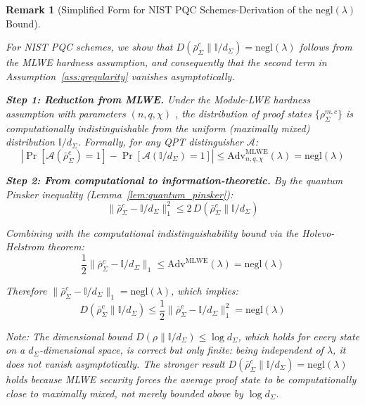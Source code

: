 \documentclass{ieeeaccess}
\newtheorem{remark}{Remark}[section]
\begin{document}
\begin{remark}[Simplified Form for NIST PQC Schemes-Derivation of 
the $\mathrm{negl}(\lambda)$ Bound]
\label{rem:nist_simplified}

For NIST PQC schemes, we show that $D(\bar{\rho}_\Sigma^c \| 
\mathbb{I}/d_\Sigma) = \mathrm{negl}(\lambda)$ follows from the 
MLWE hardness assumption, and consequently that the second term in 
Assumption~\ref{ass:qregularity} vanishes asymptotically.

\textbf{Step 1: Reduction from MLWE.}
Under the Module-LWE hardness assumption with parameters 
$(n, q, \chi)$ \cite{Langlois2015}, the distribution of 
proof states $\{\rho_\Sigma^{m,c}\}$ is computationally 
indistinguishable from the uniform (maximally mixed) 
distribution $\mathbb{I}/d_\Sigma$. Formally, for any 
QPT distinguisher $\mathcal{A}$:
\begin{equation}
    \left|\Pr[\mathcal{A}(\bar{\rho}_\Sigma^c) = 1] 
    - \Pr[\mathcal{A}(\mathbb{I}/d_\Sigma) = 1]\right|
    \leq \mathrm{Adv}^{\mathrm{MLWE}}_{n,q,\chi}(\lambda)
    = \mathrm{negl}(\lambda)
\end{equation}

\textbf{Step 2: From computational to information-theoretic.}
By the quantum Pinsker inequality (Lemma~\ref{lem:quantum_pinsker}):
\begin{equation}
    \|\bar{\rho}_\Sigma^c - \mathbb{I}/d_\Sigma\|_1^2 
    \leq 2\, D(\bar{\rho}_\Sigma^c \| \mathbb{I}/d_\Sigma)
\end{equation}

Combining with the computational indistinguishability bound via 
the Holevo-Helstrom theorem:
\begin{equation}
    \frac{1}{2}\|\bar{\rho}_\Sigma^c - \mathbb{I}/d_\Sigma\|_1
    \leq \mathrm{Adv}^{\mathrm{MLWE}}(\lambda) = \mathrm{negl}(\lambda)
\end{equation}

Therefore $\|\bar{\rho}_\Sigma^c - \mathbb{I}/d_\Sigma\|_1 
= \mathrm{negl}(\lambda)$, which implies:
\begin{equation}
    D(\bar{\rho}_\Sigma^c \| \mathbb{I}/d_\Sigma) 
    \leq \frac{1}{2}\|\bar{\rho}_\Sigma^c 
    - \mathbb{I}/d_\Sigma\|_1^2 = \mathrm{negl}(\lambda)
\end{equation}

Note: The dimensional bound $D(\rho \| \mathbb{I}/d_\Sigma) \leq \log d_\Sigma$, which holds for every state on a $d_\Sigma$-dimensional space, is correct but only finite: being independent of $\lambda$, it does not vanish asymptotically. The stronger result $D(\bar{\rho}_\Sigma^c 
\|\mathbb{I}/d_\Sigma) = \mathrm{negl}(\lambda)$ holds because 
MLWE security forces the average proof state to be 
\emph{computationally close} to maximally mixed, not merely 
bounded above by $\log d_\Sigma$.


\end{remark}
\end{document}
